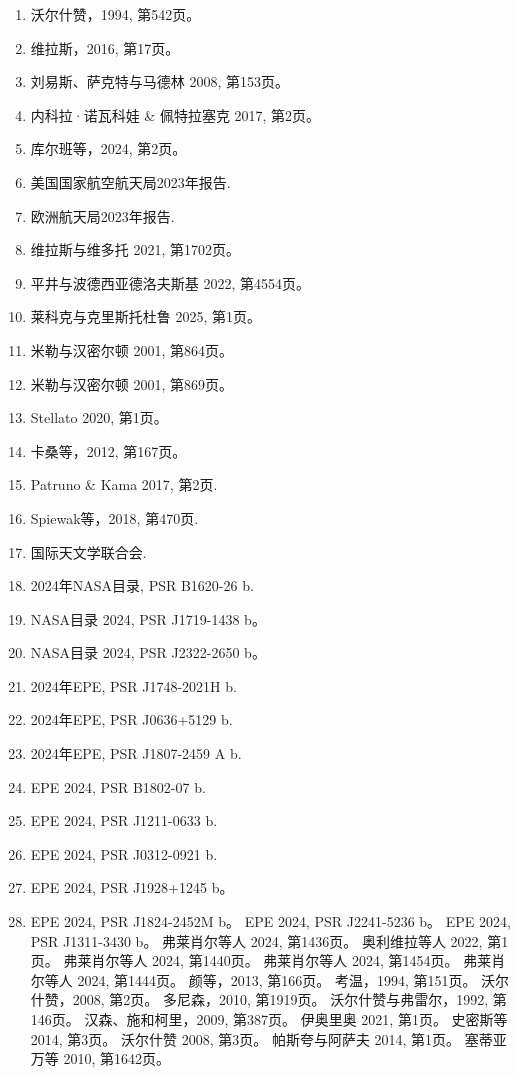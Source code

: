 \begin{enumerate}
\item 沃尔什赞，1994, 第542页。
\item 维拉斯，2016, 第17页。
\item 刘易斯、萨克特与马德林 2008, 第153页。
\item 内科拉·诺瓦科娃 & 佩特拉塞克 2017, 第2页。
\item 库尔班等，2024, 第2页。
\item 美国国家航空航天局2023年报告.
\item 欧洲航天局2023年报告.
\item 维拉斯与维多托 2021, 第1702页。
\item 平井与波德西亚德洛夫斯基 2022, 第4554页。
\item 莱科克与克里斯托杜鲁 2025, 第1页。
\item 米勒与汉密尔顿 2001, 第864页。
\item 米勒与汉密尔顿 2001, 第869页。
\item Stellato 2020, 第1页。
\item 卡桑等，2012, 第167页。
\item Patruno & Kama 2017, 第2页.
\item Spiewak等，2018, 第470页.
\item 国际天文学联合会.
\item 2024年NASA目录, PSR B1620-26 b.
\item NASA目录 2024, PSR J1719-1438 b。
\item NASA目录 2024, PSR J2322-2650 b。
\item 2024年EPE, PSR J1748-2021H b.
\item 2024年EPE, PSR J0636+5129 b.
\item 2024年EPE, PSR J1807-2459 A b.
\item EPE 2024, PSR B1802-07 b.
\item EPE 2024, PSR J1211-0633 b.
\item EPE 2024, PSR J0312-0921 b.
\item EPE 2024, PSR J1928+1245 b。
\item EPE 2024, PSR J1824-2452M b。
 EPE 2024, PSR J2241-5236 b。
 EPE 2024, PSR J1311-3430 b。
 弗莱肖尔等人 2024, 第1436页。
 奥利维拉等人 2022, 第1页。
 弗莱肖尔等人 2024, 第1440页。
 弗莱肖尔等人 2024, 第1454页。
 弗莱肖尔等人 2024, 第1444页。
 颜等，2013, 第166页。
 考温，1994, 第151页。
 沃尔什赞，2008, 第2页。
 多尼森，2010, 第1919页。
 沃尔什赞与弗雷尔，1992, 第146页。
 汉森、施和柯里，2009, 第387页。
 伊奥里奥 2021, 第1页。
 史密斯等 2014, 第3页。
 沃尔什赞 2008, 第3页。
 帕斯夸与阿萨夫 2014, 第1页。
 塞蒂亚万等 2010, 第1642页。

\end{enumerate}

